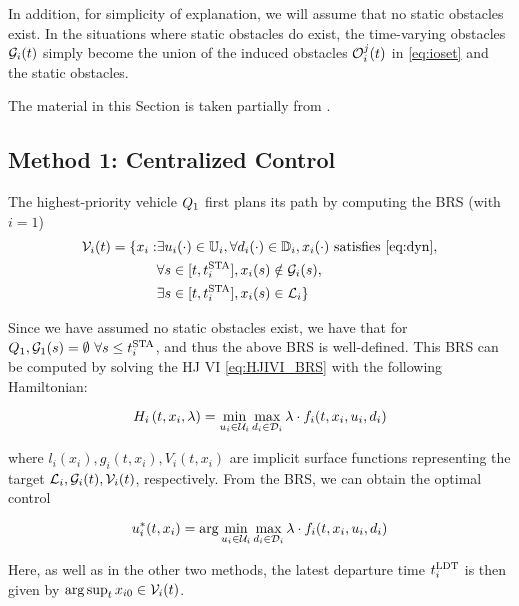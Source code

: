 In addition, for simplicity of explanation, we will assume that no static obstacles exist. In the situations where static obstacles do exist, the time-varying obstacles $\mathcal{G}_i(t)$ simply become the union of the induced obstacles $\mathcal{O}_i^j(t)$ in \eqref{eq:ioset} and the static obstacles.

The material in this Section is taken partially from \cite{Bansal2017}.

\subsection{Method 1: Centralized Control \label{sec:cc}}
The highest-priority vehicle $Q_1$ first plans its path by computing the BRS (with $i=1$)
\begin{equation}
\label{eq:BRS}
\begin{aligned}
\brs_i(t) = \{x_i: &\exists u_i(\cdot) \in \cfset_i, \forall d_i(\cdot) \in \dfset_i, x_i(\cdot) \text{ satisfies \eqref{eq:dyn}}, \\
&\forall s \in [t, \sta_i], x_i(s) \notin \obsset_i(s), \\
&\exists s \in [t, \sta_i], x_i(s) \in \targetset_i\}
\end{aligned}
\end{equation}

Since we have assumed no static obstacles exist, we have that for $Q_1, \mathcal{G}_1(s)=\emptyset ~ \forall s \le t^\text{STA}_i$, and thus the above BRS is well-defined. This BRS can be computed by solving the HJ VI \eqref{eq:HJIVI_BRS} with the following Hamiltonian:

\begin{equation}
H_i\left(t, x_i, \lambda\right) = \min_{u_i \in \mathcal{U}_i} \max_{d_i \in \mathcal{D}_i} \lambda \cdot f_i(t, x_i, u_i, d_i)
\end{equation}

\noindent where $l_i(x_i), g_i(t,x_i),V_i(t,x_i)$ are implicit surface functions representing the target $\mathcal{L}_i, \mathcal{G}_i(t), \mathcal{V}_i(t)$, respectively. From the BRS, we can obtain the optimal control

\begin{equation}
\label{eq:opt_ctrl_i}
u_i^*(t,x_i) =  \arg \min_{u_i \in \cset_i} \max_{d_i \in \dset_i} \lambda \cdot f_i(t, x_i, u_i, d_i)
\end{equation}

Here, as well as in the other two methods, the latest departure time $t^\text{LDT}_i$ is then given by $\arg \sup_t x_{i0} \in \mathcal{V}_i(t)$.

